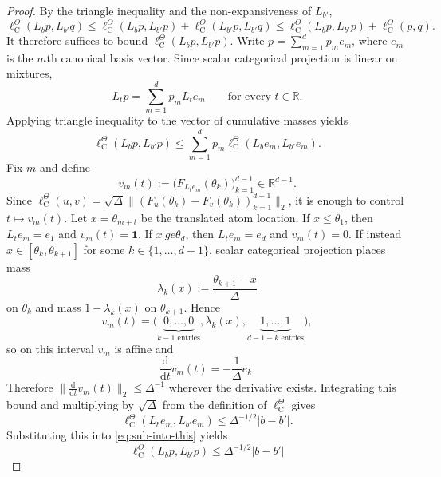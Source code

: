 \documentclass{article}
\newcommand{\R}{\mathbb{R}}
\begin{document}
\begin{proof}
By the triangle inequality and the non-expansiveness of $L_{b'}$,
\begin{equation}
\ell^\Theta_{\mathrm C}(L_b p, L_{b'}q) \le \ell^\Theta_\mathrm C(L_b p, L_{b'}p) + \ell^\Theta_\mathrm C(L_{b'} p, L_{b'} q) \le \ell^\Theta_\mathrm C(L_b p, L_{b'}p) +\ell^\Theta_\mathrm C(p, q).
\end{equation}
It therefore suffices to bound $\ell^\Theta_\mathrm C(L_b p, L_{b'}p)$. Write $p = \sum_{m=1}^d p_m e_m$, where $e_m$ is the $m$th canonical basis vector. Since scalar categorical projection is linear on mixtures,
\begin{equation}
L_t p = \sum_{m=1}^d p_m L_t e_m\qquad\text{for every } t \in \R.
\end{equation}
Applying triangle inequality to the vector of cumulative masses yields
\begin{equation}\label{eq:sub-into-this}
\ell^\Theta_\mathrm C(L_b p, L_{b'}p) \le \sum_{m=1}^d p_m\ell^\Theta_\mathrm C(L_b e_m, L_{b'}e_m).
\end{equation}
Fix $m$ and define
\begin{equation}
v_m(t) := \bigl(F_{L_t e_m}(\theta_k)\bigr)_{k=1}^{d-1} \in \R^{d-1}.
\end{equation}
Since $\ell^\Theta_\mathrm C(u,v) = \sqrt{\Delta}\bigl\lVert (F_u(\theta_k) - F_v(\theta_k))_{k=1}^{d-1}\bigr\rVert_2$, it is enough to control $t \mapsto v_m(t)$. Let $x = \theta_{m+t}$ be the translated atom location. If $x \le \theta_1$, then $L_t e_m = e_1$ and $v_m(t) = \mathbf 1$. If $x \ ge \theta_d$, then $L_t e_m = e_d$ and $v_m(t) = 0$. If instead $x \in [\theta_k, \theta_{k+1}]$ for some $k \in \{1, \dots, d-1\}$, scalar categorical projection places mass
\begin{equation}
\lambda_k(x) := \frac{\theta_{k+1} -x}{\Delta}
\end{equation}
on $\theta_k$ and mass $1 - \lambda_k(x)$ on $\theta_{k+1}$. Hence
\begin{equation}
v_m(t) = \bigl(\underbrace{0,\dots,0}_{k-1 \text{ entries}},\lambda_k(x),\underbrace{1, \dots, 1}_{d-1-k\text{ entries}}\bigr),
\end{equation}
so on this interval $v_m$ is affine and
\begin{equation}
\frac{\mathrm d}{\mathrm dt} v_m(t) = -\frac{1}{\Delta}e_k.
\end{equation}
Therefore $\bigl\lVert\frac{\mathrm d}{\mathrm dt} v_m(t) \bigr\rVert_2 \le \Delta^{-1}$ wherever the derivative exists. Integrating this bound and multiplying by $\sqrt{\Delta}$ from the definition of $\ell^\Theta_\mathrm C$ gives
\begin{equation}
\ell^\Theta_\mathrm C(L_b e_m, L_{b'}e_m) \le \Delta^{-1/2}\lvert b- b'\rvert.
\end{equation}
Substituting this into \eqref{eq:sub-into-this} yields
\begin{equation}
\ell^\Theta_\mathrm C(L_b p, L_{b'}p) \le \Delta^{-1/2}\lvert b- b'\rvert
\end{equation}
\end{proof}
\end{document}
